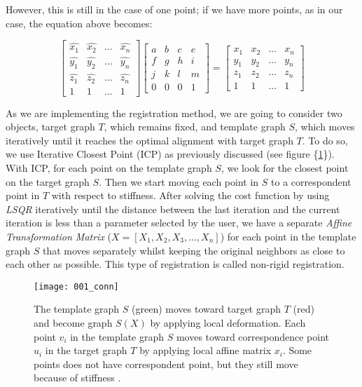 \documentclass[../structure.tex]{subfiles}
\begin{document}
However,  this is still in the case of one point; if we have more points, as in our case, the equation above becomes:

\begin{equation*}
\begin{bmatrix}
\hat{x_{1}} & \hat{x_{2}} & \dots & \hat{x_{n}}\\
\hat{y_{1}} & \hat{y_{2}} & \dots & \hat{y_{n}}\\
\hat{z_{1}} & \hat{z_{2}} & \dots & \hat{z_{n}}\\
1 & 1 & \dots & 1
\end{bmatrix}
\begin{bmatrix}
a & b & c & e\\
f & g & h & i\\
j & k & l & m\\
0 & 0 & 0 & 1
\end{bmatrix}
=
\begin{bmatrix}
x_{1} & x_{2} & \dots & x_{n}\\
y_{1} & y_{2} & \dots & y_{n}\\
z_{1} & z_{2} & \dots & z_{n}\\
1 & 1 & \dots & 1
\end{bmatrix}
\end{equation*}

\pagebreak

\hspace{2em}As we are implementing the registration method, we are going to consider two objects, target graph $T$, which remains fixed, and template graph $S$, which moves iteratively until it reaches the optimal alignment with target graph $T$. To do so, we use Iterative Closest Point (ICP) as previously discussed (see figure \{\ref{fig:icp}\}). With ICP, for each point on the template graph $S$, we look for the closest point on the target graph $S$. Then we start moving each point in $S$ to a correspondent point in $T$ with respect to stiffness. After solving the cost function by using \textit{LSQR} iteratively until the distance between the last iteration and the current iteration is less than a parameter selected by the user, we have a separate \textit{Affine Transformation Matrix} ($X = [X_{1}, X_{2}, X_{3}, ...,X_{n}]$) for each point in the template graph $S$ that moves separately whilst keeping the original neighbors as close to each other as possible. This type of registration is called non-rigid registration.

\begin{figure}[h!]
\centering
\texttt{[image: 001\_conn]}
\captionsetup{justification=centering}
\caption{The template graph $S$ (green) moves toward target graph $T$ (red) and become graph $S(X)$ by applying local deformation. Each point $v_{i}$ in the template graph $S$ moves toward correspondence point $u_{i}$ in the target graph $T$ by applying local affine matrix $x_{i}$. Some points does not have correspondent point, but they still move because of stiffness \cite{Amberg2007}.} 
\label{fig:icp}
\end{figure}
\end{document}
